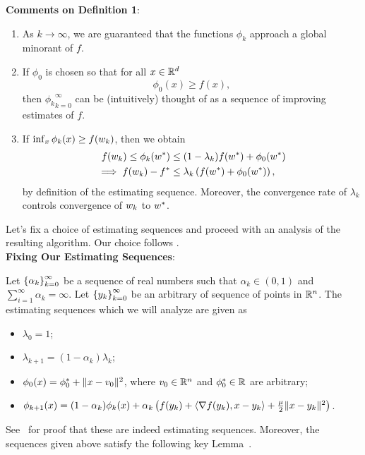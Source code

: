 \textbf{Comments on Definition 1}:
\begin{enumerate}
    \item As \( k \rightarrow \infty \), we are guaranteed that the functions \( \phi_k \) approach a global minorant of \( f \).
    \item If \( \phi_0 \) is chosen so that for all \( x \in \mathbb{R}^d \)
    \[ \phi_0(x) \geq f(x), \]
    then \( {\phi_k}_{k=0}^\infty \) can be (intuitively) thought of as a sequence of improving estimates of \( f \).
    \item If \( \inf_x \phi_k(x) \geq f(w_k) \), then we obtain
    \begin{align*}
        f(w_k) \leq \phi_k(w^*) &\leq (1 - \lambda_k) f(w^*) + \phi_0(w^*)\\
        \implies f(w_k) - f^* &\leq \lambda_k \left(f(w^*) + \phi_0(w^*)\right),
    \end{align*}
    by definition of the estimating sequence. Moreover, the convergence rate of \( \lambda_k \) controls convergence of \( w_k \) to \( w^* \).\\
\end{enumerate}

Let's fix a choice of estimating sequences and proceed with an analysis of the resulting algorithm.
Our choice follows \citet{nesterov2004lectures}.\\

\textbf{Fixing Our Estimating Sequences}:

Let \( \left\{\alpha_k\right\}_{k=0}^\infty \) be a sequence of real numbers such that \( \alpha_k \in (0,1) \) and \( \sum_{i=1}^\infty \alpha_k = \infty \). Let \( \left\{y_k\right\}_{k=0}^\infty \) be an arbitrary of sequence of points in \( \mathbb{R}^n \).
The estimating sequences which we will analyze are given as
\begin{itemize}
    \item \( \lambda_0 = 1 \);
    \item \( \lambda_{k+1} = (1- \alpha_k) \lambda_k \);
    \item \( \phi_0(x) = \phi_0^* + \|x - v_0\|^2 \), where \( v_0 \in \mathbb{R}^n \) and \( \phi_0^* \in \mathbb{R} \) are arbitrary;
    \item \( \phi_{k+1}(x) = (1-\alpha_k) \phi_k(x) + \alpha_k \left( f(y_k) + \left\langle\nabla f(y_k), x - y_k\right\rangle + \frac{\mu}{2} \|x - y_k\|^2 \right) \).
\end{itemize}

See~\citet[Lemma 2.2.2]{nesterov2004lectures} for proof that these are indeed estimating sequences. Moreover, the sequences given above satisfy the following key Lemma~\cite[Lemma~2.2.3]{nesterov2004lectures}.\\

